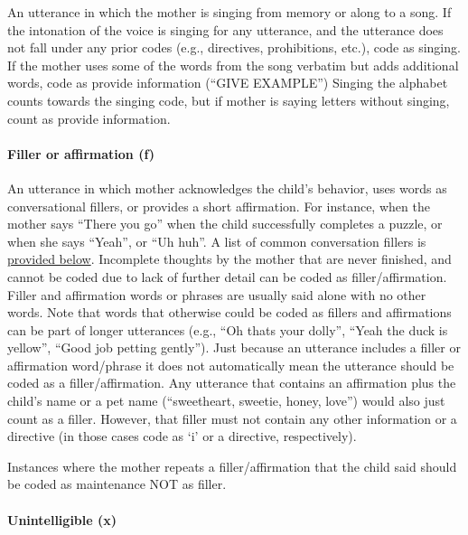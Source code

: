 \documentclass[
]{book}
\begin{document}
An utterance in which the mother is singing from memory or along to a song. If the intonation of the voice is singing for any utterance, and the utterance does not fall under any prior codes (e.g., directives, prohibitions, etc.), code as singing. If the mother uses some of the words from the song verbatim but adds additional words, code as provide information (``GIVE EXAMPLE'')
Singing the alphabet counts towards the singing code, but if mother is saying letters without singing, count as provide information.

\hypertarget{filler_affirmation}{%
\paragraph*{Filler or affirmation (f)}\label{filler_affirmation}}

An utterance in which mother acknowledges the child's behavior, uses words as conversational fillers, or provides a short affirmation. For instance, when the mother says ``There you go'' when the child successfully completes a puzzle, or when she says ``Yeah'', or ``Uh huh''. A list of common conversation fillers is \protect\hyperlink{filler_words}{provided below}.
Incomplete thoughts by the mother that are never finished, and cannot be coded due to lack of further detail can be coded as filler/affirmation.
Filler and affirmation words or phrases are usually said alone with no other words. Note that words that otherwise could be coded as fillers and affirmations can be part of longer utterances (e.g., ``Oh thats your dolly'', ``Yeah the duck is yellow'', ``Good job petting gently''). Just because an utterance includes a filler or affirmation word/phrase it does not automatically mean the utterance should be coded as a filler/affirmation.
Any utterance that contains an affirmation plus the child's name or a pet name (``sweetheart, sweetie, honey, love'') would also just count as a filler. However, that filler must not contain any other information or a directive (in those cases code as `i' or a directive, respectively).

Instances where the mother repeats a filler/affirmation that the child said should be coded as maintenance NOT as filler.

\hypertarget{unintelligible_mom}{%
\paragraph*{Unintelligible (x)}\label{unintelligible_mom}}
\end{document}
